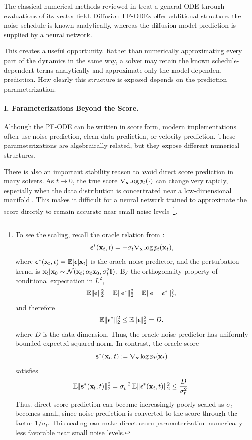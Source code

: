The classical numerical methods reviewed in  treat a
general ODE through evaluations of its vector field. Diffusion PF-ODEs offer
additional structure: the noise schedule is known analytically, whereas the
diffusion-model prediction is supplied by a neural network.

This creates a useful opportunity. Rather than numerically approximating
every part of the dynamics in the same way, a solver may retain the known
schedule-dependent terms analytically and approximate only the
model-dependent prediction. How clearly this structure is exposed depends on
the prediction parameterization.


\paragraph{I. Parameterizations Beyond the Score.}
Although the PF-ODE can be written in score form, modern implementations often
use noise prediction, clean-data prediction, or velocity prediction. These
parameterizations are algebraically related, but they expose different numerical
structures.

There is also an important stability reason to avoid direct score prediction in
many solvers. As $t\to 0$, the true score
$\nabla_{{\mathbf{x}}}\log p_t(\cdot)$ can change very rapidly, especially when the
data distribution is concentrated near a low-dimensional manifold
\citep{kim2022soft}. This makes it difficult for a neural network trained to
approximate the score directly to remain accurate near small noise levels~\footnote{To see the scaling, recall the oracle relation from
:
\[
    {\bm{\epsilon}}^*({\mathbf{x}}_t,t)
    =
    -\sigma_t\nabla_{{\mathbf{x}}}\log p_t({\mathbf{x}}_t),
\]
where ${\bm{\epsilon}}^*({\mathbf{x}}_t,t)
    =
    \mathbb{E}[{\bm{\epsilon}}|{\mathbf{x}}_t]$ is the oracle noise predictor, and the perturbation kernel is $ {\mathbf{x}}_t|{\mathbf{x}}_0
    \sim
    \mathcal{N}({\mathbf{x}}_t; \alpha_t{\mathbf{x}}_0,\sigma_t^2{\mathbf{I}})$. By the orthogonality property of conditional expectation in $L^2$,
\[
    \mathbb{E}\|{\bm{\epsilon}}\|_2^2
    =
    \mathbb{E}\|{\bm{\epsilon}}^*\|_2^2
    +
    \mathbb{E}\|{\bm{\epsilon}}-{\bm{\epsilon}}^*\|_2^2,
\]
and therefore
\[
    \mathbb{E}\|{\bm{\epsilon}}^*\|_2^2
    \le
    \mathbb{E}\|{\bm{\epsilon}}\|_2^2
    =
    D,
\]
where $D$ is the data dimension. Thus, the oracle noise predictor has uniformly bounded expected squared norm. In contrast, the oracle score
\[
    {\mathbf{s}}^*({\mathbf{x}}_t,t)
    :=
    \nabla_{{\mathbf{x}}}\log p_t({\mathbf{x}}_t)
\]
satisfies
\[
    \mathbb{E}\|{\mathbf{s}}^*({\mathbf{x}}_t,t)\|_2^2
    =
    \sigma_t^{-2}\,
    \mathbb{E}\|{\bm{\epsilon}}^*({\mathbf{x}}_t,t)\|_2^2
    \le
    \frac{D}{\sigma_t^2}.
\]
Thus, direct score prediction can become increasingly poorly scaled as
$\sigma_t$ becomes small, since noise prediction is converted to the score
through the factor $1/\sigma_t$. This scaling can make direct score
parameterization numerically less favorable near small noise levels.}.


